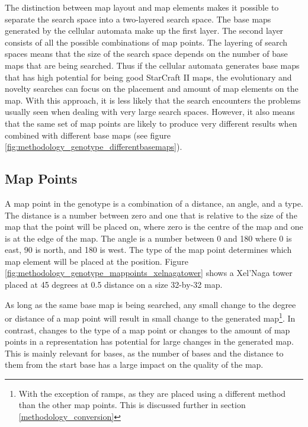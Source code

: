 The distinction between map layout and map elements makes it possible to separate the search space into a two-layered search space. The base maps generated by the cellular automata make up the first layer. The second layer consists of all the possible combinations of map points. The layering of search spaces means that the size of the search space depends on the number of base maps that are being searched. Thus if the cellular automata generates base maps that has high potential for being good StarCraft II maps, the evolutionary and novelty searches can focus on the placement and amount of map elements on the map. With this approach, it is less likely that the search encounters the problems usually seen when dealing with very large search spaces. However, it also means that the same set of map points are likely to produce very different results when combined with different base maps (see figure \ref{fig:methodology_genotype_differentbasemaps}).


\subsection{Map Points}
\label{methodology_genotype_mappoints}
A map point in the genotype is a combination of a distance, an angle, and a type. The distance is a number between zero and one that is relative to the size of the map that the point will be placed on, where zero is the centre of the map and one is at the edge of the map. The angle is a number between 0 and 180 where 0 is east, 90 is north, and 180 is west. The type of the map point determines which map element will be placed at the position. Figure \ref{fig:methodology_genotype_mappoints_xelnagatower} shows a Xel'Naga tower placed at 45 degrees at 0.5 distance on a size 32-by-32 map.


As long as the same base map is being searched, any small change to the degree or distance of a map point will result in small change to the generated map\footnote{With the exception of ramps, as they are placed using a different method than the other map points. This is discussed further in section \ref{methodology_conversion}}. In contrast, changes to the type of a map point or changes to the amount of map points in a representation has potential for large changes in the generated map. This is mainly relevant for bases, as the number of bases and the distance to them from the start base has a large impact on the quality of the map.

